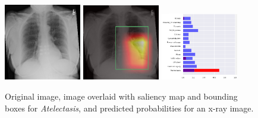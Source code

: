 \documentclass[12pt,oneside,a4paper]{report}
\begin{document}
\begin{figure}[H]
  \centering
  \includegraphics[width=0.3\textwidth]{images/preds/atelectasis}\hspace{0.01\textwidth}%
  \includegraphics[width=0.3\textwidth]{images/preds/atelectasis_cam}\hspace{0.01\textwidth}%
  \includegraphics[width=0.3\textwidth]{images/preds/atelectasis_probs}\\[0.01\textwidth]
  \caption{Original image, image overlaid with saliency map and bounding boxes
    for \emph{Atelectasis}, and predicted probabilities for an x-ray image.}
  \label{examples_1}
\end{figure}
\end{document}
